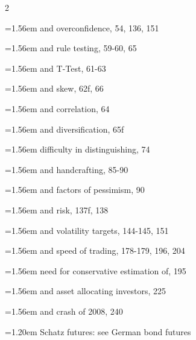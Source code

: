 {\begin{multicols}{2}
\par \noindent\hangindent=1.56em\hspace*{0.36em} and overconfidence, 54, 136, 151
\par \noindent\hangindent=1.56em\hspace*{0.36em} and rule testing, 59-60, 65
\par \noindent\hangindent=1.56em\hspace*{0.36em} and T-Test, 61-63
\par \noindent\hangindent=1.56em\hspace*{0.36em} and skew, 62f, 66
\par \noindent\hangindent=1.56em\hspace*{0.36em} and correlation, 64
\par \noindent\hangindent=1.56em\hspace*{0.36em} and diversification, 65f
\par \noindent\hangindent=1.56em\hspace*{0.36em} difficulty in distinguishing, 74
\par \noindent\hangindent=1.56em\hspace*{0.36em} and handcrafting, 85-90
\par \noindent\hangindent=1.56em\hspace*{0.36em} and factors of pessimism, 90
\par \noindent\hangindent=1.56em\hspace*{0.36em} and risk, 137f, 138
\par \noindent\hangindent=1.56em\hspace*{0.36em} and volatility targets, 144-145, 151
\par \noindent\hangindent=1.56em\hspace*{0.36em} and speed of trading, 178-179, 196, 204
\par \noindent\hangindent=1.56em\hspace*{0.36em} need for conservative estimation of, 195
\par \noindent\hangindent=1.56em\hspace*{0.36em} and asset allocating investors, 225
\par \noindent\hangindent=1.56em\hspace*{0.36em} and crash of 2008, 240
\par \noindent\hangindent=1.20em\hspace*{0.00em} Schatz futures: see German bond futures

\end{multicols}}
